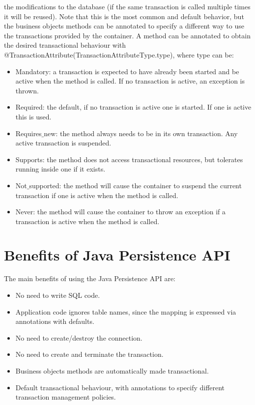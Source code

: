 \documentclass[12pt, a4paper]{report}
\begin{document}
    the modifications to the database (if the same transaction is called multiple times it will be reused). Note that this is the most common and default behavior, but 
    the business objects methods can be annotated to specify a different way to use the transactions provided by the container. A method can be annotated to obtain the 
    desired transactional behaviour with @TransactionAttribute(TransactionAttributeType.type), where type can be: 
    \begin{itemize}
        \item Mandatory: a transaction is expected to have already been started and be active when the method is called. If no transaction is active, an exception is thrown.
        \item Required: the default, if no transaction is active one is started. If one is active this is used.
        \item Requires$\_$new: the method always needs to be in its own transaction. Any active transaction is suspended. 
        \item Supports: the method does not access transactional resources, but tolerates running inside one if it exists.
        \item Not$\_$supported: the method will cause the container to suspend the current transaction if one is active when the method is called. 
        \item Never: the method will cause the container to throw an exception if a transaction is active when the method is called.
    \end{itemize}

    \section{Benefits of Java Persistence API}
    The main benefits of using the Java Persistence API are: 
    \begin{itemize}
        \item No need to write SQL code.
        \item Application code ignores table names, since the mapping is expressed via annotations with defaults. 
        \item No need to create/destroy the connection. 
        \item No need to create and terminate the transaction. 
        \item Business objects methods are automatically made transactional. 
        \item Default transactional behaviour, with annotations to specify different transaction management policies. 
    \end{itemize}
\end{document}
